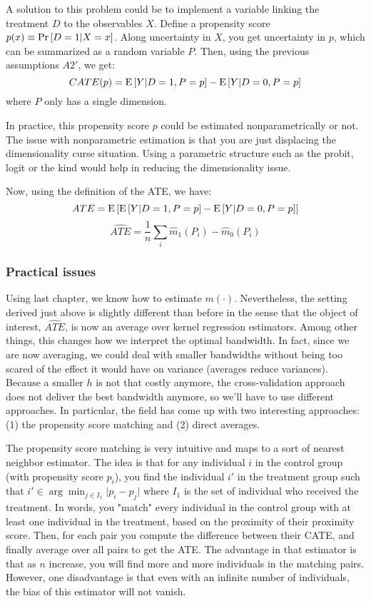 A solution to this problem could be to implement a variable linking the treatment $D$ to the observables $X$. Define a propensity score $p(x) \equiv \operatorname{Pr}\left[D = 1\vert X = x\right]$. Along uncertainty in $X$, you get uncertainty in $p$, which can be summarized as a random variable $P$. Then, using the previous assumptions $A2'$, we get: $$ CATE(p) = \operatorname{E}\left[Y \vert D=1, P=p\right] - \operatorname{E}\left[Y\vert D=0, P=p\right] $$ where $P$ only has a single dimension.

In practice, this propensity score $p$ could be estimated nonparametrically or not. The issue with nonparametric estimation is that you are just displacing the dimensionality curse situation. Using a parametric structure such as the probit, logit or the kind would help in reducing the dimensionality issue.

Now, using the definition of the ATE, we have: $$ATE = \operatorname{E}\left[\operatorname{E}\left[Y \vert D=1, P=p\right] - \operatorname{E}\left[Y\vert D=0, P=p\right]\right]$$ $$\widehat{ATE} = \frac{1}{n} \sum_i \hat m_1(P_i) - \hat m_0(P_i) $$

\subsubsection{Practical issues}

Using last chapter, we know how to estimate $m(\cdot)$. Nevertheless, the setting derived just above is slightly different than before in the sense that the object of interest, $\widehat{ATE}$, is now an average over kernel regression estimators. Among other things, this changes how we interpret the optimal bandwidth. In fact, since we are now averaging, we could deal with smaller bandwidths without being too scared of the effect it would have on variance (averages reduce variances). Because a smaller $h$ is not that costly anymore, the cross-validation approach does not deliver the best bandwidth anymore, so we'll have to use different approaches. In particular, the field has come up with two interesting approaches: (1) the propensity score matching and (2) direct averages.

The propensity score matching is very intuitive and maps to a sort of nearest neighbor estimator. The idea is that for any individual $i$ in the control group (with propensity score $p_i$), you find the individual $i'$ in the treatment group such that $i'\in\arg\min_{j\in I_1} \vert p_i - p_j\vert$ where $I_1$ is the set of individual who received the treatment. In words, you "match" every individual in the control group with at least one individual in the treatment, based on the proximity of their proximity score. Then, for each pair you compute the difference between their CATE, and finally average over all pairs to get the ATE. The advantage in that estimator is that as $n$ increase, you will find more and more individuals in the matching pairs. However, one disadvantage is that even with an infinite number of individuals, the bias of this estimator will not vanish.


